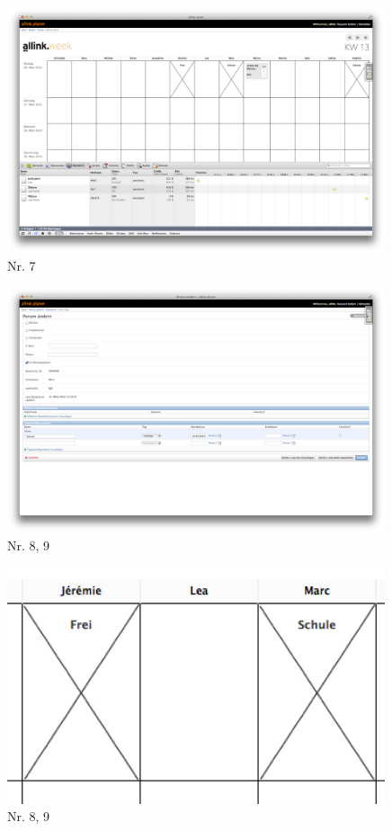 \begin{figure}[htbp]
    \centering
        \includegraphics[width=0.99\textwidth,angle=0]{bilder/testing/Task_loeschen.png}
    \caption{Nr. 7}
    \label{fig:bilder_testing_Task_loeschen}
\end{figure}
\begin{figure}[htbp]
    \centering
        \includegraphics[width=0.99\textwidth,angle=0]{bilder/testing/Sperrtag_erstellen.png}
    \caption{Nr. 8, 9}
    \label{fig:bilder_testing_Sperrtag_erstellen}
\end{figure}
\begin{figure}[htbp]
    \centering
        \includegraphics[width=0.99\textwidth,angle=0]{bilder/testing/Sperrtag_Person_zuweisen.png}
    \caption{Nr. 8, 9}
    \label{fig:bilder_testing_Sperrtag_Person_zuweisen}
\end{figure}
